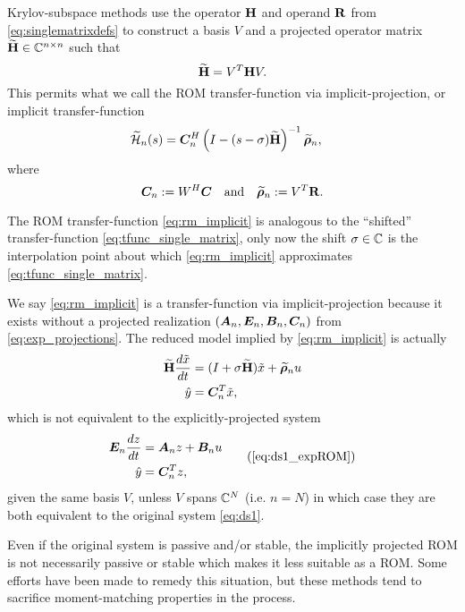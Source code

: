 Krylov-subspace  methods  use the operator $\textbf{\textup{H}}$ and operand $\textbf{\textup{R}}$ from \eqref{eq:singlematrixdefs} to construct a basis $V$ and a projected operator matrix $\widetilde{\textbf{\textup{H}}}\in \mathbb{C}^{n \times n}$ such that
\begin{equation}
\widetilde{\textbf{\textup{H}}} = V^T \textbf{\textup{H}} V.
\label{eq:projected_op}
\end{equation}
This permits what we call the ROM transfer-function via implicit-projection, or implicit transfer-function
 \begin{align}
      \widetilde{\mathcal{H}}_n(s) &=  \bm{C}_n^H \left(I-(s-\sigma )\widetilde{\textbf{\textup{H}}}\right)^{-1}\widetilde{\boldsymbol{\rho}}_n,
      \label{eq:rm_implicit}
      \end{align}
      where
      \[
        \bm{C}_n := W^H \bm{C} \quad\textrm{and}\quad \widetilde{\boldsymbol{\rho}}_n := V^T \textbf{\textup{R}}.
      \]

The ROM transfer-function \eqref{eq:rm_implicit}  is analogous to the ``shifted'' transfer-function \eqref{eq:tfunc_single_matrix}, only now the shift $\sigma\in\mathbb{C}$ is the interpolation point about which   \eqref{eq:rm_implicit} approximates \eqref{eq:tfunc_single_matrix}.

We say \eqref{eq:rm_implicit} is a transfer-function via implicit-projection because it exists without a projected realization $(\bm{A}_n,\bm{E}_n,\bm{B}_n,\bm{C}_n)$ from \eqref{eq:exp_projections}.   The reduced model implied by \eqref{eq:rm_implicit} is actually
  \begin{equation}
         \begin{aligned}
                \widetilde{\textbf{\textup{H}}} \frac{d\tilde{x}}{dt} &=  (I+\sigma \widetilde{\textbf{\textup{H}}})\tilde{x} + \widetilde{\boldsymbol{\rho}}_n u\\
                \hat{y} &= \bm{C}_n^T \tilde{x},
        \end{aligned}
        \label{eq:implied_ds1}
        \end{equation}
which is not equivalent to the explicitly-projected system 
 \begin{equation}
         \begin{aligned}
                \E_n \frac{dz}{dt} &= \A_nz + \BB_n u\\
                \hat{y} &= \CC_n^T z,
        \end{aligned}
        \tag{\ref{eq:ds1_expROM}}
        \end{equation}
 given the same basis $V$, unless $V$ spans $\mathbb{C}^N$ (i.e. $n=N$) in which case they are both equivalent to the original system \eqref{eq:ds1}.   

\medskip
Even if the original system is passive and/or stable, the implicitly projected ROM is not necessarily passive or stable  which makes it less suitable as a ROM.   Some efforts  \cite{arnoldiMOR,grimme1996restart,jaimoukha1997implicitMOR} have been made to remedy this situation, but these methods tend to sacrifice moment-matching properties in the process. 

